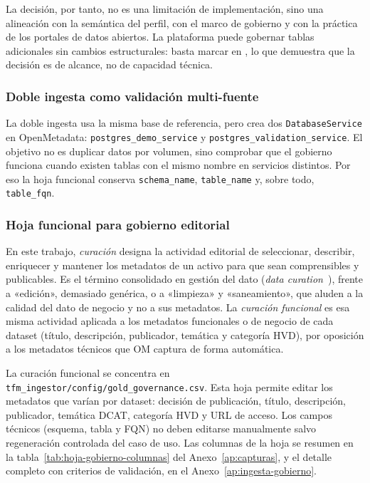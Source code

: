 La decisión, por tanto, no es una limitación de implementación, sino una alineación con la semántica del perfil, con el marco de gobierno y con la práctica de los portales de datos abiertos. La plataforma puede gobernar tablas adicionales sin cambios estructurales: basta marcar  en , lo que demuestra que la decisión es de alcance, no de capacidad técnica.

\subsubsection{Doble ingesta como validación multi-fuente}

La doble ingesta usa la misma base de referencia, pero crea dos \texttt{DatabaseService} en OpenMetadata: \texttt{postgres\_demo\_service} y \texttt{postgres\_validation\_service}. El objetivo no es duplicar datos por volumen, sino comprobar que el gobierno funciona cuando existen tablas con el mismo nombre en servicios distintos. Por eso la hoja funcional conserva \texttt{schema\_name}, \texttt{table\_name} y, sobre todo, \texttt{table\_fqn}.

\subsubsection{Hoja funcional para gobierno editorial}

En este trabajo, \emph{curación} designa la actividad editorial de seleccionar, describir, enriquecer y mantener los metadatos de un activo para que sean comprensibles y publicables. Es el término consolidado en gestión del dato (\emph{data curation}~\cite{damaDmbok}), frente a «edición», demasiado genérica, o a «limpieza» y «saneamiento», que aluden a la calidad del dato de negocio y no a sus metadatos. La \emph{curación funcional} es esa misma actividad aplicada a los metadatos funcionales o de negocio de cada dataset (título, descripción, publicador, temática y categoría \ac{HVD}), por oposición a los metadatos técnicos que \ac{OM} captura de forma automática.

La curación funcional se concentra en \texttt{tfm\_ingestor/config/gold\_governance.csv}. Esta hoja permite editar los metadatos que varían por dataset: decisión de publicación, título, descripción, publicador, temática DCAT, categoría HVD y URL de acceso. Los campos técnicos (esquema, tabla y \ac{FQN}) no deben editarse manualmente salvo regeneración controlada del caso de uso. Las columnas de la hoja se resumen en la tabla~\ref{tab:hoja-gobierno-columnas} del Anexo~\ref{ap:capturas}, y el detalle completo con criterios de validación, en el Anexo~\ref{ap:ingesta-gobierno}.

